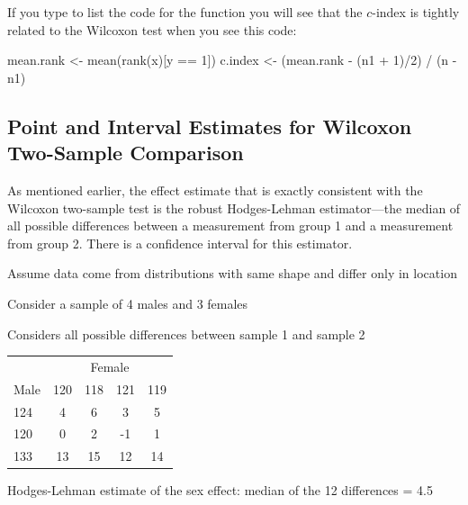 If you type  to list the code for the function you will
see that the $c$-index is tightly related to the Wilcoxon test when
you see this code:
\begin{Schunk}
\begin{Sinput}
mean.rank <- mean(rank(x)[y == 1])
c.index <- (mean.rank - (n1 + 1)/2) / (n - n1)
\end{Sinput}
\end{Schunk}

\subsection{Point and Interval Estimates for Wilcoxon Two-Sample Comparison}
As mentioned earlier, the effect estimate that is exactly consistent
with the Wilcoxon two-sample test is the robust Hodges-Lehman estimator---the
median of all possible differences between a measurement from group 1
and a measurement from group 2.  There is a confidence interval for
this estimator.
\bi
\item Assume data come from distributions with same shape and differ only in location
\item Consider a sample of 4 males and 3 females
\item Considers all possible differences between sample 1 and sample 2
\ei
\begin{center}\begin{tabular}{l|cccc} \hline \hline \label{pg:nonpar-mf}
 & \multicolumn{4}{c}{Female} \\
Male & 120 & 118 & 121 & 119 \\ \hline
124 & 4 & 6 & 3 & 5 \\ 
120 & 0 & 2 & -1 & 1 \\
133 & 13 & 15 & 12 & 14 \\ \hline
\end{tabular}\end{center}
\bi
\item Hodges-Lehman estimate of the sex effect: median of the 12
  differences = 4.5
\ei

